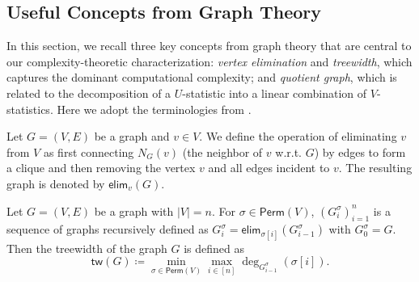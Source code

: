 \documentclass[twoside,11pt]{article}
\newcommand{\sPi}{\pi}
\newcommand{\sper}{\sigma}
\newcommand{\perm}[1]{\mathsf{Perm}(#1)}
\newcommand{\partition}{\Pi}
\newcommand{\partitionp}[1]{\partition_{#1}}
\newcommand{\degp}[2]{\deg_{#2}(#1)}
\newcommand{\neighborvg}[2]{N_{#2}(#1)}
\newcommand{\treewidthp}[1]{\mathsf{tw}(#1)}
\newcommand{\eliminatevg}[2]{\mathsf{elim}_{#1}(#2)}
\begin{document}
\subsection{Useful Concepts from Graph Theory}
\label{sec:graph}

In this section, we recall three key concepts from graph theory that are central to our complexity-theoretic characterization: \emph{vertex elimination} 
and \emph{treewidth}, which captures the dominant computational complexity; and \emph{quotient graph}, which is related to the decomposition of a $U$-statistic into a linear combination of $V$-statistics. Here we adopt the terminologies from \citet{bodlaender2010treewidth}.

\begin{definition}
\label{def:vertex_elimination}
Let $G = (V, E)$ be a graph and $v \in V$. We define the operation of eliminating $v$ from $V$ as first connecting $\neighborvg{v}{G}$ (the neighbor of $v$ w.r.t. $G$) by edges to form a clique and then removing the vertex $v$ and all edges incident to $v$. The resulting graph is denoted by $\eliminatevg{v}{G}$. 
\end{definition}

\begin{definition}[Treewidth]
\label{def:treewidth_elimination}
Let $G = (V, E)$ be a graph with $|V| = n$. For $\sigma \in \perm{V}$, $(G_i^{\sigma})_{i=1}^n$ is a sequence of graphs recursively defined as $G_i^\sigma = \eliminatevg{\sigma[i]}{G_{i-1}^\sigma}$ with $G_0^\sigma = G$. Then the treewidth of the graph $G$ is defined as 
\begin{equation*}
\treewidthp{G} \coloneqq \min_{\sigma \in \perm{V}} \max_{i \in [n]} \degp{\sper[i]}{G_{i-1}^\sigma}. 
\end{equation*}
\end{definition}
\end{document}
